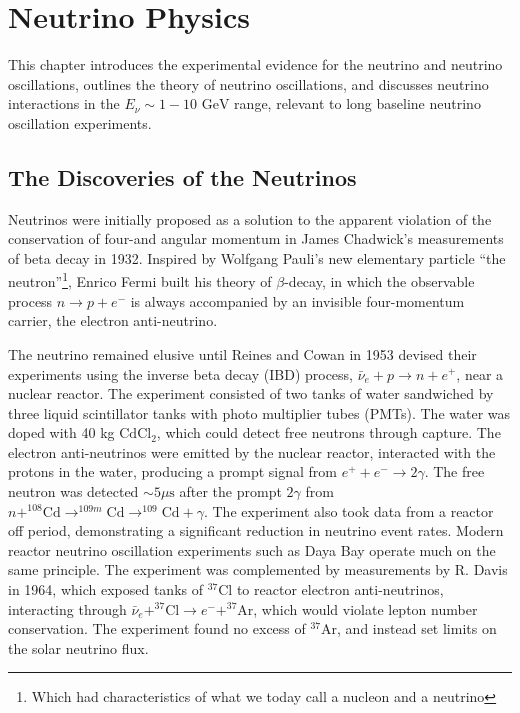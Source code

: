 \chapter{Neutrino Physics}
\label{chap:theory}
This chapter introduces the experimental evidence for the neutrino and neutrino oscillations, outlines the theory of neutrino oscillations, and discusses neutrino interactions in the $E_\nu\sim1-10 \text{ GeV}$ range, relevant to long baseline neutrino oscillation experiments.

\section{The Discoveries of the Neutrinos}
Neutrinos were initially proposed as a solution to the apparent violation of the conservation of four-and angular momentum in James Chadwick's measurements of beta decay in 1932\cite{Chadwick1,Chadwick2}. Inspired by Wolfgang Pauli's new elementary particle ``the neutron''\footnote{Which had characteristics of what we today call a nucleon and a neutrino}\cite{pauli_1933}, Enrico Fermi built his theory of $\beta$-decay\cite{fermi_1934}, in which the observable process $n \rightarrow p + e^-$ is always accompanied by an invisible four-momentum carrier, the electron anti-neutrino.

The neutrino remained elusive until Reines and Cowan in 1953 devised their experiments using the inverse beta decay (IBD) process, $\bar{\nu}_e + p \rightarrow n + e^+$, near a nuclear reactor\cite{reines_cowan_1,reines_cowan_2}. The experiment consisted of two tanks of water sandwiched by three liquid scintillator tanks with photo multiplier tubes (PMTs). The water was doped with 40 kg $\text{CdCl}_2$, which could detect free neutrons through capture. The electron anti-neutrinos were emitted by the nuclear reactor, interacted with the protons in the water, producing a prompt signal from $e^+ + e^- \rightarrow 2\gamma$. The free neutron was detected $\sim5\mu\text{s}$ after the prompt $2\gamma$ from $n + ^{108}\text{Cd} \rightarrow ^{109m}\text{Cd} \rightarrow ^{109}\text{Cd} + \gamma$. The experiment also took data from a reactor off period, demonstrating a significant reduction in neutrino event rates. Modern reactor neutrino oscillation experiments such as Daya Bay\cite{daya_bay} operate much on the same principle. The experiment was complemented by measurements by R. Davis  in 1964\cite{davis}, which exposed tanks of $^{37}\text{Cl}$ to reactor electron anti-neutrinos, interacting through $\bar{\nu}_e + ^{37}\text{Cl} \rightarrow e^- + ^{37}\text{Ar}$, which would violate lepton number conservation. The experiment found no excess of $^{37}\text{Ar}$, and instead set limits on the solar neutrino flux. 

